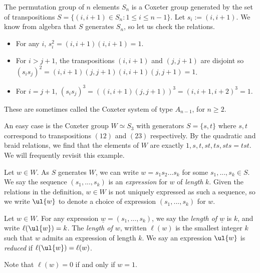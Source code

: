 \begin{example}\label{example-CG}
    The permutation group of $n$ elements $S_n$ is a Coxeter group generated by the set of transpositions $S = \{(i,i+1) \in S_n : 1 \leq i \leq n-1\}$. Let $s_i := (i,i+1)$. We know from algebra that $S$ generates $S_n$, so let us check the relations.
    \begin{itemize}
        \item For any $i$, $s_i^2 = (i,i+1)(i,i+1) = 1$.
        \item For $i > j+1$, the transpositions $(i,i+1)$ and $(j,j+1)$ are disjoint so $(s_i s_j)^2 = (i,i+1)(j,j+1)(i,i+1)(j,j+1) = 1$.
        \item For $i = j+1$, $(s_i s_j)^3 = ((i,i+1)(j,j+1))^3 = (i,i+1,i+2)^3 = 1$.
    \end{itemize}
    These are sometimes called the Coxeter system of type $A_{n-1}$, for $n \geq 2$.

    An easy case is the Coxeter group $W \simeq S_3$ with generators $S = \{s,t\}$ where $s,t$ correspond to transpositions $(12)$ and $(23)$ respectively. By the quadratic and braid relations, we find that the elements of $W$ are exactly $1,s,t,st,ts,sts=tst$. We will frequently revisit this example. %

\end{example}

\begin{definition}
    Let $w \in W$. As $S$ generates $W$, we can write $w = s_1 s_2 ... s_k$ for some $s_1,...,s_k \in S$. We say the sequence $(s_1, ..., s_k)$ is an \textit{expression} for $w$ of \textit{length} $k$. Given the relations in the definition, $w \in W$ is not uniquely expressed as such a sequence, so we write $\ul{w}$ to denote a choice of expression $(s_1, ..., s_k)$ for $w$.
\end{definition}

\begin{definition}
    Let $w \in W$. For any expression $\underline{w} = (s_1, ..., s_k)$, we say the \textit{length of $\underline{w}$} is $k$, and write $\ell(\ul{w}) = k$. The \textit{length of $w$}, written $\ell(w)$ is the smallest integer $k$ such that $w$ admits an expression of length $k$. We say an expression $\ul{w}$ is \textit{reduced} if $\ell(\ul{w}) = \ell(w)$.
\end{definition}

Note that $\ell(w) = 0$ if and only if $w = 1$.

